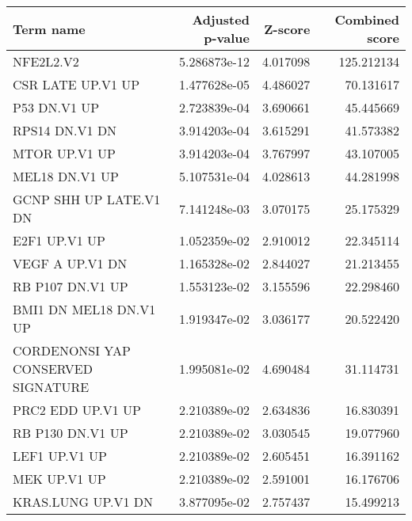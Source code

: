 \begin{tabular}{lrrr}
\toprule
                         Term name &  Adjusted p-value &  Z-score &  Combined score \\
\midrule
                         NFE2L2.V2 &      5.286873e-12 & 4.017098 &      125.212134 \\
                 CSR LATE UP.V1 UP &      1.477628e-05 & 4.486027 &       70.131617 \\
                      P53 DN.V1 UP &      2.723839e-04 & 3.690661 &       45.445669 \\
                    RPS14 DN.V1 DN &      3.914203e-04 & 3.615291 &       41.573382 \\
                     MTOR UP.V1 UP &      3.914203e-04 & 3.767997 &       43.107005 \\
                    MEL18 DN.V1 UP &      5.107531e-04 & 4.028613 &       44.281998 \\
            GCNP SHH UP LATE.V1 DN &      7.141248e-03 & 3.070175 &       25.175329 \\
                     E2F1 UP.V1 UP &      1.052359e-02 & 2.910012 &       22.345114 \\
                   VEGF A UP.V1 DN &      1.165328e-02 & 2.844027 &       21.213455 \\
                  RB P107 DN.V1 UP &      1.553123e-02 & 3.155596 &       22.298460 \\
            BMI1 DN MEL18 DN.V1 UP &      1.919347e-02 & 3.036177 &       20.522420 \\
CORDENONSI YAP CONSERVED SIGNATURE &      1.995081e-02 & 4.690484 &       31.114731 \\
                 PRC2 EDD UP.V1 UP &      2.210389e-02 & 2.634836 &       16.830391 \\
                  RB P130 DN.V1 UP &      2.210389e-02 & 3.030545 &       19.077960 \\
                     LEF1 UP.V1 UP &      2.210389e-02 & 2.605451 &       16.391162 \\
                      MEK UP.V1 UP &      2.210389e-02 & 2.591001 &       16.176706 \\
                KRAS.LUNG UP.V1 DN &      3.877095e-02 & 2.757437 &       15.499213 \\
\bottomrule
\end{tabular}
